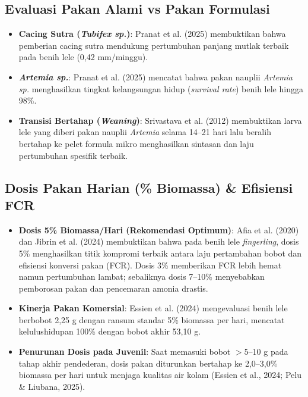 \documentclass[11pt,a4paper]{article}
\begin{document}
\subsection{Evaluasi Pakan Alami vs Pakan Formulasi}
\begin{itemize}[leftmargin=*,itemsep=2pt,topsep=2pt]
    \item \textbf{Cacing Sutra (\textit{Tubifex sp.})}: Pranat et al. (2025) membuktikan bahwa pemberian cacing sutra mendukung pertumbuhan panjang mutlak terbaik pada benih lele (0,42 mm/minggu).
    \item \textbf{\textit{Artemia sp.}}: Pranat et al. (2025) mencatat bahwa pakan nauplii \textit{Artemia sp.} menghasilkan tingkat kelangsungan hidup (\textit{survival rate}) benih lele hingga 98\%.
    \item \textbf{Transisi Bertahap (\textit{Weaning})}: Srivastava et al. (2012) membuktikan larva lele yang diberi pakan nauplii \textit{Artemia} selama 14--21 hari lalu beralih bertahap ke pelet formula mikro menghasilkan sintasan dan laju pertumbuhan spesifik terbaik.
\end{itemize}

\subsection{Dosis Pakan Harian (\% Biomassa) \& Efisiensi FCR}
\begin{itemize}[leftmargin=*,itemsep=2pt,topsep=2pt]
    \item \textbf{Dosis 5\% Biomassa/Hari (Rekomendasi Optimum)}: Afia et al. (2020) dan Jibrin et al. (2024) membuktikan bahwa pada benih lele \textit{fingerling}, dosis 5\% menghasilkan titik kompromi terbaik antara laju pertambahan bobot dan efisiensi konversi pakan (FCR). Dosis 3\% memberikan FCR lebih hemat namun pertumbuhan lambat; sebaliknya dosis 7--10\% menyebabkan pemborosan pakan dan pencemaran amonia drastis.
    \item \textbf{Kinerja Pakan Komersial}: Essien et al. (2024) mengevaluasi benih lele berbobot 2,25 g dengan ransum standar 5\% biomassa per hari, mencatat kelulushidupan 100\% dengan bobot akhir 53,10 g.
    \item \textbf{Penurunan Dosis pada Juvenil}: Saat memasuki bobot $>$5--10 g pada tahap akhir pendederan, dosis pakan diturunkan bertahap ke 2,0--3,0\% biomassa per hari untuk menjaga kualitas air kolam (Essien et al., 2024; Pelu \& Liubana, 2025).
\end{itemize}
\end{document}
